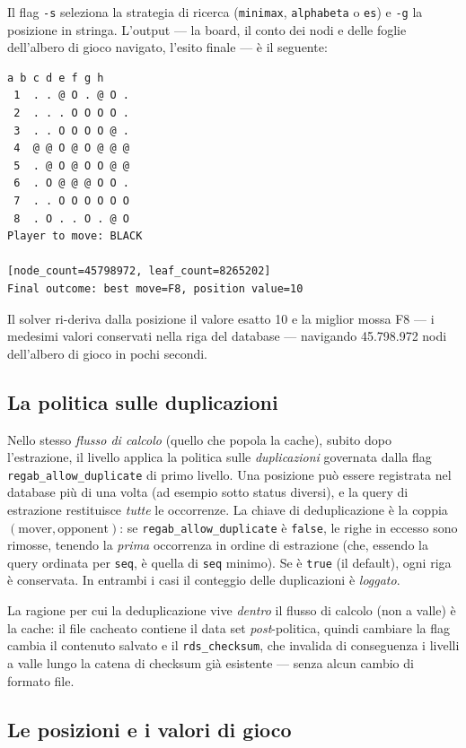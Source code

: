 Il flag \texttt{-s} seleziona la strategia di ricerca (\texttt{minimax},
\texttt{alphabeta} o \texttt{es}) e \texttt{-g} la posizione in stringa.
L'output — la board, il conto dei nodi e delle foglie dell'albero di gioco
navigato, l'esito finale — è il seguente:

\begin{lstlisting}[caption={L'output della risoluzione.}]
    a b c d e f g h
 1  . . @ O . @ O .
 2  . . . O O O O .
 3  . . O O O O @ .
 4  @ @ O @ O @ @ @
 5  . @ O @ O O @ @
 6  . O @ @ @ O O .
 7  . . O O O O O O
 8  . O . . O . @ O
Player to move: BLACK

[node_count=45798972, leaf_count=8265202]
Final outcome: best move=F8, position value=10
\end{lstlisting}

Il solver ri-deriva dalla posizione il valore esatto 10 e la miglior mossa
F8 — i medesimi valori conservati nella riga del database — navigando
45.798.972 nodi dell'albero di gioco in pochi secondi.

\subsection{La politica sulle duplicazioni}

Nello stesso \emph{flusso di calcolo} (quello che popola la cache), subito
dopo l'estrazione, il livello applica la politica sulle
\emph{duplicazioni} governata dalla flag
\texttt{regab\_allow\_duplicate} di primo livello. Una posizione può essere
registrata nel database più di una volta (ad esempio sotto status diversi),
e la query di estrazione restituisce \emph{tutte} le occorrenze. La chiave di
deduplicazione è la coppia $(\text{mover}, \text{opponent})$: se
\texttt{regab\_allow\_duplicate} è \texttt{false}, le righe in eccesso sono
rimosse, tenendo la \emph{prima} occorrenza in ordine di estrazione (che,
essendo la query ordinata per \texttt{seq}, è quella di \texttt{seq} minimo).
Se è \texttt{true} (il default), ogni riga è conservata. In entrambi i casi il
conteggio delle duplicazioni è \emph{loggato}.

La ragione per cui la deduplicazione vive \emph{dentro} il flusso di calcolo
(non a valle) è la cache: il file cacheato contiene il data set
\emph{post}-politica, quindi cambiare la flag cambia il contenuto salvato e il
\texttt{rds\_checksum}, che invalida di conseguenza i livelli a valle lungo la
catena di checksum già esistente — senza alcun cambio di formato file.

\subsection{Le posizioni e i valori di gioco}

